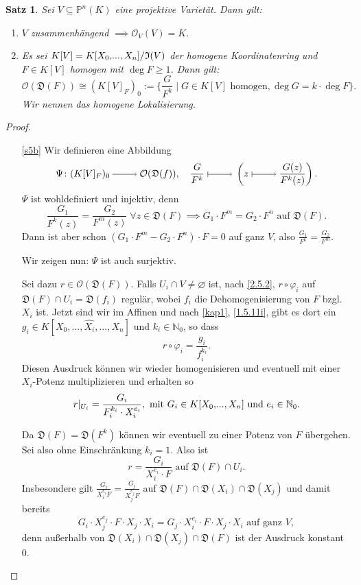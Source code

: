\documentclass[a4paper,12pt]{scrbook}
\newtheorem{proof}{Beweis}
\newtheorem{satz}{Satz}
\def\I{\mathfrak{I}}
\def\O{\mathcal{O}}
\def\P{\mathbb{P}}
\newcommand{\D}{\mathfrak{D}}
\newcommand{\leer}{\ensuremath{\varnothing}}
\newcommand{\restrict}[1]{|_{#1}}
\renewcommand{\dotsc}{\ensuremath{\!...}}
\newcommand{\set}[1]{\ensuremath{\mathbb{#1}}}
\newcommand{\N}{\set{N}}
\newcommand{\ra}{\raisebox{-1pt}{\tikz{\draw[thin,shorten >=3pt, ->] (0,0) node{\hspace*{-2pt}} -- node{} (1,0);}}\penalty1000\relax}
\renewcommand{\mapsto}{\raisebox{-1pt}{\tikz{\draw[thin,shorten >=3pt, |->] (0,0) node{\hspace*{0pt}} -- node{} (1,0);}}\penalty1000\relax}
\newcommand{\dach}{\widehat}
\newcommand{\Quotient}[2]{
  \mathchoice
  { %
    \raisebox{0.7ex}{\ensuremath{#1}}
    \ensuremath{\mkern-3mu}\big/\ensuremath{\mkern-3mu}
    \raisebox{-0.6ex}{\ensuremath{#2}}
  }
  { %
    #1/#2
  }
  { %
    #1/#2
  }
  { %
    #1/#2
  }
}
\newcommand{\ppolyx}[1][n]{\ensuremath%
  [X_{0},\dotsc,X_{#1}]}
\begin{document}
\begin{satz}\label{satz5}
Sei $V\subseteq\P^{n}(K)$ eine projektive Varietät. Dann gilt:
\begin{enumerate}
\item{} $V$ zusammenhängend $\implies\O_{V}(V)=K$.
\item{} Es sei $K[V]=\Quotient{K\ppolyx}{\I(V)}$ der homogene Koordinatenring und $F\in K[V]$ homogen mit $\deg F\geq 1$. Dann gilt:
\[\O(\D(F))\cong(K[V]_{F})_{0}:=\{\frac{G}{F^{k}}\mid G\in K[V]\text{ homogen}, \deg G = k\cdot\deg F\}.\]
Wir nennen das \emph{homogene Lokalisierung}.
\end{enumerate}\end{satz}
\begin{proof}\begin{enumerate}
\item[\ref{s5b}] Wir definieren eine Abbildung
\[\Psi\colon(K[V]_{F})_{0}\ra\O(\D(f)),\quad\frac{G}{F^{k}}\mapsto\left(z\mapsto\frac{G(z)}{F^{k}(z)}\right).\]
$\Psi$ ist wohldefiniert und injektiv, denn
\[\frac{G_{1}}{F^{k}(z)}=\frac{G_{2}}{F^{m}(z)}\;\forall z\in\D(F)\implies G_{1}\cdot F^{m}=G_{2}\cdot F^{n}\text{ auf }\D(F).\]
Dann ist aber schon $(G_{1}\cdot F^{m}-G_{2}\cdot F^{n})\cdot F=0$ auf ganz $V$, also $\frac{G_{1}}{F^{k}}=\frac{G_{2}}{F^{m}}$.

Wir zeigen nun: $\Psi$ ist auch surjektiv.

Sei dazu $r\in\O(\D(F))$. Falls $U_{i}\cap V\neq\leer$ ist, nach \cref{2.5.2}, $r\circ\varphi_{i}$ auf $\D(F)\cap U_{i}=\D(f_{i})$ regulär, wobei $f_{i}$ die Dehomogenisierung von $F$ bzgl. $X_{i}$ ist. Jetzt sind wir im Affinen und nach \cref{kap1}, \cref{1.5.11i}, gibt es dort ein $g_{i}\in K[X_{0},\dotsc,\dach{X_{i}},\dotsc,X_{n}]$ und $k_{i}\in\N_{0}$, so dass
\[r\circ\varphi_{i}=\frac{g_{i}}{f_{i}^{k_{i}}}.\]
Diesen Ausdruck können wir wieder homogenisieren und eventuell mit einer $X_{i}$-Potenz multiplizieren und erhalten so
\[r\restrict{U_{i}}=\frac{G_{i}}{F_{i}^{k_{i}}\cdot X_{i}^{e_{i}}},\text{ mit }G_{i}\in K\ppolyx\text{ und }e_{i}\in\N_{0}.\]

Da $\D(F)=\D(F^{k})$ können wir eventuell zu einer Potenz von $F$ übergehen. Sei also ohne Einschränkung $k_{i}=1$. Also ist
\[r=\frac{G_{i}}{X_{i}^{e_{i}}\cdot F}\text{ auf }\D(F)\cap U_{i}.\]
Insbesondere gilt $\frac{G_{i}}{X_{i}^{e_{i}}F}=\frac{G_{j}}{X_{j}^{e_{j}}F}$ auf $\D(F)\cap\D(X_{i})\cap\D(X_{j})$ und damit bereits
\begin{equation}\label{s5s}G_{i}\cdot X_{j}^{e_{j}}\cdot F\cdot X_{j}\cdot X_{i}=G_{j}\cdot X_{i}^{e_{i}}\cdot F\cdot X_{j}\cdot X_{i}\text{ auf ganz }V,\tag{$*$}\end{equation}
denn außerhalb von $\D(X_{i})\cap\D(X_{j})\cap\D(F)$ ist der Ausdruck konstant $0$.


\end{enumerate}
\end{proof}
\end{document}
